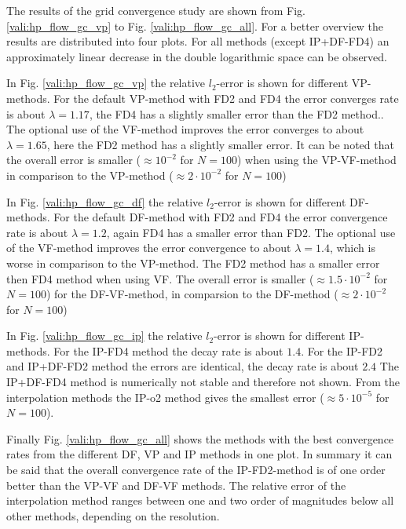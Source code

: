 The results of the grid convergence study are shown from Fig. \ref{vali:hp_flow_gc_vp} to Fig. \ref{vali:hp_flow_gc_all}.
For a better overview the results are distributed into four plots.
For all methods (except IP+DF-FD4) an approximately linear decrease in the double logarithmic space can be observed.

In Fig. \ref{vali:hp_flow_gc_vp} the relative $l_2$-error is shown for different VP-methods.
For the default VP-method with FD2 and FD4 the error converges rate is about $\lambda=1.17$,
the FD4 has a slightly smaller error than the FD2 method..
The optional use of the VF-method improves the error converges to about $\lambda=1.65$,
here the FD2 method has a slightly smaller error.
It can be noted that the overall error is smaller ($\approx 10^{-2}$ for $N=100$)
when using the VP-VF-method in comparison to the VP-method ($\approx2\cdot 10^{-2}$ for $N=100$)

In Fig. \ref{vali:hp_flow_gc_df} the relative $l_2$-error is shown for different DF-methods.
For the default DF-method with FD2 and FD4 the error convergence rate is about $\lambda=1.2$,
again FD4 has a smaller error than FD2.
The optional use of the VF-method improves the error convergence to about $\lambda=1.4$,
which is worse in comparison to the VP-method. The FD2 method has a smaller error then FD4 method when using VF.
The overall error is smaller ($\approx 1.5 \cdot 10^{-2}$ for $N=100$) for the DF-VF-method,
in comparsion to the DF-method ($\approx2\cdot 10^{-2}$ for $N=100$)

In Fig. \ref{vali:hp_flow_gc_ip} the relative $l_2$-error is shown for different IP-methods.
For the IP-FD4 method the decay rate is about $1.4$.
For the IP-FD2 and IP+DF-FD2 method the errors are identical, the decay rate is about $2.4$
The IP+DF-FD4 method is numerically not stable and therefore not shown.
From the interpolation methods the IP-o2 method gives the smallest error  ($\approx 5 \cdot 10^{-5}$ for $N=100$).

Finally Fig. \ref{vali:hp_flow_gc_all} shows the methods  with the best convergence
rates from the different DF, VP and IP methods in one plot.
In summary it can be said that the overall convergence rate of the IP-FD2-method is of one order better
than the VP-VF and DF-VF methods. The relative error of the interpolation method ranges
between one and two order of magnitudes below all other methods, depending on the resolution.

